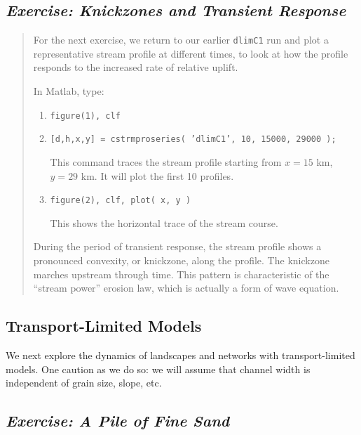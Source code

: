 \documentclass[12pt,reqno]{amsart}
\begin{document}
\subsection*{\em Exercise: Knickzones and Transient Response}

\begin{quote}
\small
{\sf
For the next exercise, we return to our earlier {\tt dlimC1} run and plot a representative stream profile at different times, to look at how the profile responds to the increased rate of relative uplift.

\noindent
In Matlab, type: 
\begin{enumerate}
\item
{\tt figure(1), clf}
\item
{\tt [d,h,x,y] = cstrmproseries( 'dlimC1', 10, 15000, 29000 );}

\noindent
This command traces the stream profile starting from $x=15$ km, $y=29$
km. It will plot the first 10 profiles.
\item
{\tt figure(2), clf, plot( x, y )}

\noindent
This shows the horizontal trace of the stream course.
\end{enumerate}

\noindent
During the period of transient response, the stream profile shows a
pronounced convexity, or knickzone, along the profile. The knickzone
marches upstream through time. This pattern is characteristic of the
``stream power'' erosion law, which is actually a form of wave
equation.
}
\end{quote}

\subsection{Transport-Limited Models}

We next explore the dynamics of landscapes and networks with transport-limited models. One caution as we do so: we will assume that channel width is independent of grain size, slope, etc.

\subsection*{\em Exercise: A Pile of Fine Sand}
\end{document}
